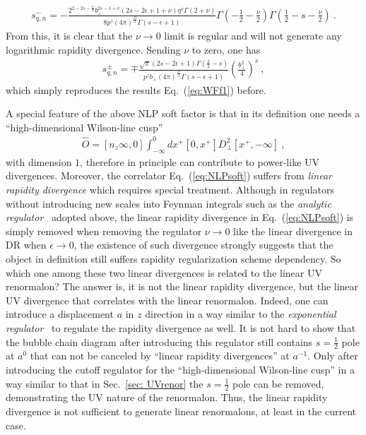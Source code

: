 \documentclass[a4paper,11pt]{article}
\begin{document}
\begin{align}
s_{q,n}^-=-\frac{2^{2-2s-\frac{\nu}{2}}b_\perp^{2s-1+\nu}(2s-2\epsilon+1+\nu)\eta^{\nu}\Gamma(2+\nu)}{8p^z(4\pi)^{\frac{D}{2}}\Gamma(s-\epsilon+1)}\Gamma\left(-\frac{1}{2}-\frac{\nu}{2}\right)\Gamma\left(\frac{1}{2}-s-\frac{\nu}{2}\right) \ .
\end{align}
From this, it is clear that the $\nu \rightarrow 0$ limit is regular and will not generate any logarithmic rapidity divergence. Sending $\nu$ to zero, one has
\begin{align}
s_{q,n}^{\pm}=\mp \frac{\sqrt{\pi}(2s-2\epsilon+1)\Gamma\left(\frac{1}{2}-s\right)}{p^zb_\perp(4\pi)^{\frac{D}{2}}\Gamma(s-\epsilon+1)}\left(\frac{b_\perp^2}{4}\right)^s \ ,
\end{align}
which simply reproduces the results Eq.~(\ref{eq:WFf1}) before. 

A special feature of the above NLP soft factor is that in its definition one needs a ``high-dimensional Wilson-line cusp'' 
\begin{align}
\hat O=[n_z\infty,0]\int_{-\infty}^{0} dx^+[0,x^+]D_\perp^2[x^+,-\infty] \ ,
\end{align}
with dimension $1$, therefore in principle can contribute to power-like UV divergences. Moreover, the correlator Eq.~(\ref{eq:NLPsoft}) suffers from {\it linear rapidity divergence} which requires special treatment. Although in regulators without introducing new scales into Feynman integrals such as the {\it analytic regulator}~\cite{Becher:2010tm} adopted above, the linear rapidity divergence in Eq.~(\ref{eq:NLPsoft}) is simply removed when removing the regulator $\nu \rightarrow 0$ like the linear divergence in DR when $\epsilon \rightarrow 0$, the existence of such divergence strongly suggests that the object in definition still suffers rapidity regularization scheme dependency. So which one among these two linear divergences is related to the linear UV renormalon? The answer is, it is not the linear rapidity divergence, but the linear UV divergence that correlates with the linear renormalon. Indeed, one can introduce a displacement $a$ in $z$ direction in a way similar to the {\it exponential regulator}~\cite{Li:2016axz,Moult:2018jzp} to regulate the rapidity divergence as well. It is not hard to show that the bubble chain diagram after introducing this regulator still contains $s=\frac{1}{2}$ pole at $a^0$ that can not be canceled by ``linear rapidity divergences'' at $a^{-1}$. Only after introducing the cutoff regulator for the ``high-dimensional Wilson-line cusp'' in a way similar to that in Sec.~\ref{sec: UVrenor} the $s=\frac{1}{2}$ pole can be removed, demonstrating the UV nature of the renormalon. Thus, the linear rapidity divergence is not sufficient to generate linear renormalons, at least in the current case. 
\end{document}
